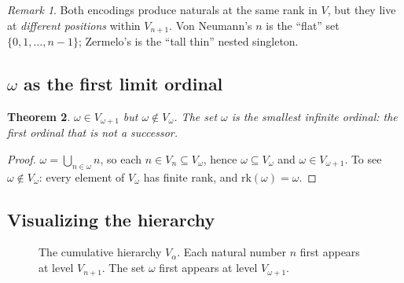 \documentclass[12pt]{article}
\newtheorem{theorem}{Theorem}[section]
\theoremstyle{definition}
\theoremstyle{remark}
\newtheorem{remark}[theorem]{Remark}
\begin{document}
\begin{remark}
Both encodings produce naturals at the same rank in $V$, but they live at
\emph{different positions} within $V_{n+1}$. Von Neumann's $n$ is the
``flat'' set $\{0,1,\ldots,n-1\}$; Zermelo's is the ``tall thin'' nested
singleton.
\end{remark}

\subsection{\texorpdfstring{$\omega$}{omega} as the first limit ordinal}

\begin{theorem}\label{thm:omega-first-limit}
$\omega \in V_{\omega+1}$ but $\omega \notin V_\omega$. The set $\omega$
is the smallest infinite ordinal: the first ordinal that is not a successor.
\end{theorem}

\begin{proof}
$\omega = \bigcup_{n \in \omega} n$, so each $n \in V_n \subseteq V_\omega$,
hence $\omega \subseteq V_\omega$ and $\omega \in V_{\omega+1}$. To see
$\omega \notin V_\omega$: every element of $V_\omega$ has finite rank, and
$\mathrm{rk}(\omega) = \omega$.
\end{proof}

\subsection{Visualizing the hierarchy}

\begin{figure}[ht]
\centering
{}
\caption{The cumulative hierarchy $V_\alpha$. Each natural number $n$ first
appears at level $V_{n+1}$. The set $\omega$ first appears at level
$V_{\omega+1}$.}
\label{fig:hierarchy}
\end{figure}
\end{document}
